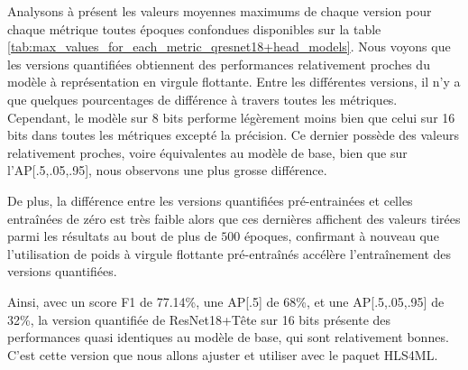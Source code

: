 Analysons à présent les valeurs moyennes maximums de chaque version pour chaque métrique toutes époques confondues disponibles sur la table \ref{tab:max_values_for_each_metric_qresnet18+head_models}. Nous voyons que les versions quantifiées obtiennent des performances relativement proches du modèle à représentation en virgule flottante. Entre les différentes versions, il n'y a que quelques pourcentages de différence à travers toutes les métriques. Cependant, le modèle sur 8 bits performe légèrement moins bien que celui sur 16 bits dans toutes les métriques excepté la précision. Ce dernier possède des valeurs relativement proches, voire équivalentes au modèle de base, bien que sur l'AP[.5,.05,.95], nous observons une plus grosse différence.

De plus, la différence entre les versions quantifiées pré-entrainées et celles entraînées de zéro est très faible alors que ces dernières affichent des valeurs tirées parmi les résultats au bout de plus de $500$ époques, confirmant à nouveau que l'utilisation de poids à virgule flottante pré-entraînés accélère l'entraînement des versions quantifiées.

Ainsi, avec un score F1 de 77.14\%, une AP[.5] de 68\%, et une AP[.5,.05,.95] de 32\%, la version quantifiée de ResNet18+Tête sur 16 bits présente des performances quasi identiques au modèle de base, qui sont relativement bonnes. C'est cette version que nous allons ajuster et utiliser avec le paquet HLS4ML.

